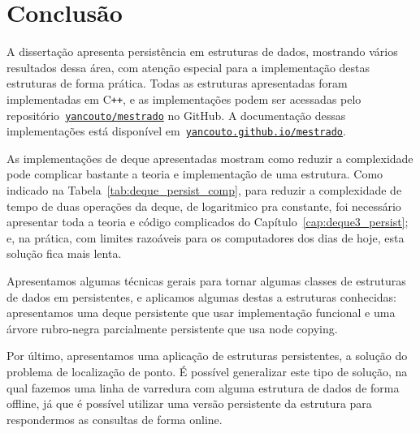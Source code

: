 \documentclass[main.tex]{subfiles}
\begin{document}
\setcounter{secnumdepth}{0}

\chapter*{Conclusão}

A dissertação apresenta persistência em estruturas de dados, mostrando vários resultados dessa área, com atenção especial para a implementação destas estruturas de forma prática. Todas as estruturas apresentadas foram implementadas em C\texttt{++}, e as implementações podem ser acessadas pelo repositório~\mbox{\href{https://github.com/yancouto/mestrado/}{\texttt{yancouto/mestrado}}} no GitHub. A documentação dessas implementações está disponível em~\mbox{\href{https://yancouto.github.io/mestrado/}{\texttt{yancouto.github.io/mestrado}}}.

As implementações de deque apresentadas mostram como reduzir a complexidade pode complicar bastante a teoria e implementação de uma estrutura. Como indicado na Tabela~\ref{tab:deque_persist_comp}, para reduzir a complexidade de tempo de duas operações da deque, de logaritmico pra constante, foi necessário apresentar toda a teoria e código complicados do Capítulo~\ref{cap:deque3_persist}; e, na prática, com limites razoáveis para os computadores dos dias de hoje, esta solução fica mais lenta.

Apresentamos algumas técnicas gerais para tornar algumas classes de estruturas de dados em persistentes, e aplicamos algumas destas a estruturas conhecidas: apresentamos uma deque persistente que usar implementação funcional e uma árvore rubro-negra parcialmente persistente que usa node copying.

Por último, apresentamos uma aplicação de estruturas persistentes, a solução do problema de localização de ponto. É possível generalizar este tipo de solução, na qual fazemos uma linha de varredura com alguma estrutura de dados de forma offline, já que é possível utilizar uma versão persistente da estrutura para respondermos as consultas de forma online.

\setcounter{secnumdepth}{1}
\end{document}
